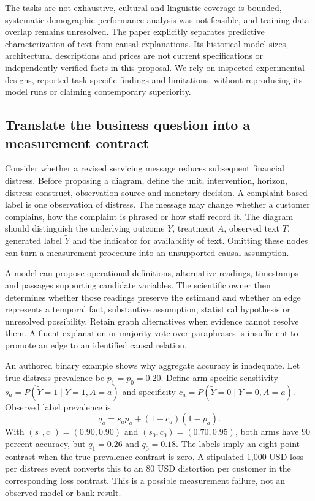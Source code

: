 The tasks are not exhaustive, cultural and linguistic coverage is bounded, systematic demographic performance analysis was not feasible, and training-data overlap remains unresolved. The paper explicitly separates predictive characterization of text from causal explanations. Its historical model sizes, architectural descriptions and prices are not current specifications or independently verified facts in this proposal. We rely on inspected experimental designs, reported task-specific findings and limitations, without reproducing its model runs or claiming contemporary superiority.~\citep{exec24_css_original}

\subsection{Translate the business question into a measurement contract}
Consider whether a revised servicing message reduces subsequent financial distress. Before proposing a diagram, define the unit, intervention, horizon, distress construct, observation source and monetary decision. A complaint-based label is one observation of distress. The message may change whether a customer complains, how the complaint is phrased or how staff record it. The diagram should distinguish the underlying outcome $Y$, treatment $A$, observed text $T$, generated label $\widetilde Y$ and the indicator for availability of text. Omitting these nodes can turn a measurement procedure into an unsupported causal assumption.~\citep{exec24_css_knowledge_reference}

A model can propose operational definitions, alternative readings, timestamps and passages supporting candidate variables. The scientific owner then determines whether those readings preserve the estimand and whether an edge represents a temporal fact, substantive assumption, statistical hypothesis or unresolved possibility. Retain graph alternatives when evidence cannot resolve them. A fluent explanation or majority vote over paraphrases is insufficient to promote an edge to an identified causal relation.~\citep{exec24_css_knowledge_reference}

An authored binary example shows why aggregate accuracy is inadequate. Let true distress prevalence be $p_1=p_0=0.20$. Define arm-specific sensitivity $s_a=P(\widetilde Y=1\mid Y=1,A=a)$ and specificity $c_a=P(\widetilde Y=0\mid Y=0,A=a)$. Observed label prevalence is
\[
 q_a=s_a p_a+(1-c_a)(1-p_a).
\]
With $(s_1,c_1)=(0.90,0.90)$ and $(s_0,c_0)=(0.70,0.95)$, both arms have 90 percent accuracy, but $q_1=0.26$ and $q_0=0.18$. The labels imply an eight-point contrast when the true prevalence contrast is zero. A stipulated 1,000 USD loss per distress event converts this to an 80 USD distortion per customer in the corresponding loss contrast. This is a possible measurement failure, not an observed model or bank result.~\citep{exec24_css_knowledge_reference}

